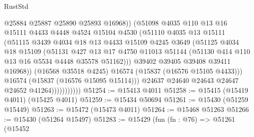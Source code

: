\begin{lexlean}{RustStd}
\begin{coremodule}
{\begin{coremodule}
{{{{{{{{{{{{{{{{{{{{{{{{{{{{{{{{{{{{{{{{{{{{{{{{{{{{{{{{{{{{                                @25884
                                @25887
                                @25890
                                @25893
                                @16968))
                            (@51098
                              @4035
                              @110
                              @13
                              @16
                              @15111
                              @4433
                              @4448
                              @4524
                              @15104
                              @4530
                              (@51110
                                @4035
                                @13
                                @15111
                                (@51115
                                  @3439
                                  @4034
                                  @18
                                  @13
                                  @4433
                                  @15109
                                  @4245
                                  @3649
                                  (@51125
                                    @4034
                                    @18
                                    @15109
                                    (@51131
                                      @427
                                      @13
                                      @17
                                      @4750
                                      @11013
                                      @51144
                                      (@51130 @414 @110 @13 @16 @5534 @4448 @35578 @51162)))
                                  @39402
                                  @39405
                                  @39408
                                  @39411
                                  @16968))
                              (@16568 @35518 @4245)
                              @16574
                              (@15837 (@16576 @15105 @4433)))
                            @16574
                            (@15837 (@16576 @15095 @15114)))
                          @24637
                          @24640
                          @24643
                          @24647
                          @24652
                          @41264)))))))))))
@51254 := @15413 @4011
@51258 := @15415 (@15419 @4011) (@15425 @4011)
@51259 := @15434 @50694
@51261 := @15430 (@51259 @15449)
@51263 := @15472 (@15473 @4011)
@51264 := @15468 @51263
@51266 := @15430 (@51264 @15497)
@51283 := @15429
    (fun (fn : @76) =>
    @51261
      (@15452
}}}}}}}}}}}}}}}}}}}}}}}}}}}}}}}}}}}}}}}}}}}}}}}}}}}}}}}}}}}}
\end{coremodule}}
\end{coremodule}
\end{lexlean}
